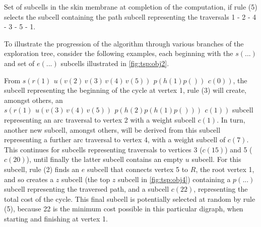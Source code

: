 
\begin{cpobjectsfloat}
\begin{cpobjects}
\end{cpobjects}
\caption{\label{fig:tsp:obj4}Set of subcells in the skin membrane at completion of the computation, if rule (5) selects the subcell containing the path subcell representing the traversals 1 - 2 - 4 - 3 - 5 - 1.}
\end{cpobjectsfloat}

To illustrate the progression of the algorithm through various branches of the exploration tree, consider the following examples, each beginning with the \(s(...)\) and set of \(e(...)\) subcells illustrated in \autoref{fig:tsp:obj2}.

From \(s(r(1) ~ \,u(v(2)\,v(3)\,v(4)\,v(5))\, ~ p(h(1)p()) ~ \,c(0))\), the subcell representing the beginning of the cycle at vertex 1, rule (3) will create, amongst others, an \(s(r(1) ~ \,u(v(3)\,v(4)\,v(5)) ~ \,p(h(2)p(h(1)p())) ~ \,c(1))\) subcell representing an arc traversal to vertex 2 with a weight subcell \(c(1)\).  In turn, another new subcell, amongst others, will be derived from this subcell representing a further arc traversal to vertex 4, with a weight subcell of \(c(7)\).  This continues for subcells representing traversals to vertices 3 (\(c(15)\)) and 5 (\(c(20)\)), until finally the latter subcell contains an empty \(u\) subcell.  For this subcell, rule (2) finds an \(e\) subcell that connects vertex 5 to \(R\), the root vertex 1, and so creates a \(z\) subcell (the top \(z\) subcell in \autoref{fig:tsp:obj4}) containing a \(p(...)\) subcell representing the traversed path, and a subcell \(c(22)\), representing the total cost of the cycle.  This final subcell is potentially selected at random by rule (5), because 22 is the minimum cost possible in this particular digraph, when starting and finishing at vertex 1.

